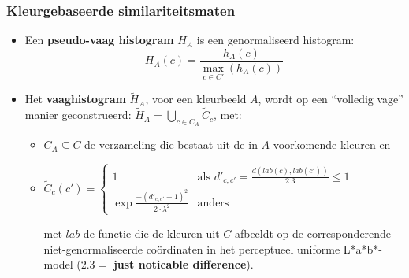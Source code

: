 \documentclass[dutch]{beamer}
\theoremstyle{definition}
\theoremstyle{remark}
\theoremstyle{example}
\begin{document}
{
  \frametitle{Kleurgebaseerde similariteitsmaten}
  
  \begin{itemize}
  \item Een \textbf{pseudo-vaag histogram} $H_A$ is een genormaliseerd histogram:
  \begin{displaymath}
  H_A(c) = \frac{\displaystyle h_A(c)}{\displaystyle \max_{c \in C'}(h_A(c))}
  \end{displaymath}
  \item Het \textbf{vaaghistogram} $\widetilde{H}_A$, voor een kleurbeeld $A$, wordt
  op een ``volledig vage'' manier geconstrueerd:
  $\widetilde{H}_A = \bigcup_{c \in C_A} \widetilde{C}_c$,
  met:
  \begin{itemize} 
  \item $C_A \subseteq C$ de verzameling die bestaat uit de in $A$ voorkomende kleuren en
  \item
  \begin{minipage}{\textwidth}
  \scriptsize
  $\widetilde{C}_c(c') =
  \begin{cases}
  1 & \text{als } d'_{c,c'} = \frac{d \left( lab(c), lab(c') \right)}{2.3} \leq 1 \\ 
  \exp \frac{- \left( d'_{c,c'} - 1 \right)^2}{2 \cdot \lambda^2} & \text{anders}
  \end{cases}$
  \vspace{4pt}
  \end{minipage}
  met $lab$ de 
  functie die de kleuren uit $C$ afbeeldt op de corresponderende niet-genormaliseerde 
  co\"ordinaten in het perceptueel uniforme L*a*b*-model 
  ($2.3 =$ \textbf{just noticable difference}).
  \end{itemize}
  \end{itemize}
}
\frame
\end{document}
